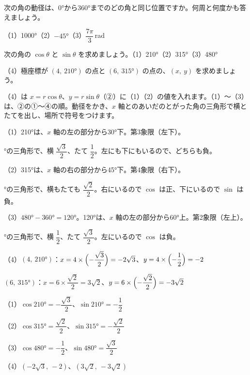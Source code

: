 \begin{jibun}
次の角の動径は、0°から360°までのどの角と同じ位置ですか。何周と何度かも答えましょう。\par
（1）1000°\quad（2）$-45°$\quad（3）$\dfrac{7\pi}{3}$\,rad
\end{jibun}

\begin{reidai}
次の角の $\cos\theta$ と $\sin\theta$ を求めましょう。\quad（1）210°\quad（2）315°\quad（3）480°\par
（4）極座標が $(4,\ 210°)$ の点と $(6,\ 315°)$ の点の、$(x,\ y)$ を求めましょう。\par
\kangaekata （4）は $x=r\cos\theta$、$y=r\sin\theta$（②）に（1）（2）の値を入れます。（1）〜（3）は、②の①〜④の順。動径をかき、$x$ 軸とのあいだのとがった角の三角形で横とたてを出し、場所で符号をつけます。\par
\shiki{}\zw{} （1）210°は、$x$ 軸の左の部分から30°下。第3象限（左下）。\par
{}°の三角形で、横 $\dfrac{\sqrt3}{2}$、たて $\dfrac{1}{2}$。左にも下にもいるので、どちらも負。\par
\bkiviq （2）315°は、$x$ 軸の右の部分から45°下。第4象限（右下）。\par
{}°の三角形で、横もたても $\dfrac{\sqrt2}{2}$。右にいるので $\cos$ は正、下にいるので $\sin$ は負。\par
\bkiviq （3）$480°-360°=120°$。120°は、$x$ 軸の左の部分から60°上。第2象限（左上）。\par
{}°の三角形で、横 $\dfrac{1}{2}$、たて $\dfrac{\sqrt3}{2}$。左にいるので $\cos$ は負。\par
\bkiviq （4）$(4,\ 210°)$：$x=4\times\Bigl(-\dfrac{\sqrt3}{2}\Bigr)=-2\sqrt3$、\enspace $y=4\times\Bigl(-\dfrac{1}{2}\Bigr)=-2$\par
\bkivib $(6,\ 315°)$：$x=6\times\dfrac{\sqrt2}{2}=3\sqrt2$、\enspace $y=6\times\Bigl(-\dfrac{\sqrt2}{2}\Bigr)=-3\sqrt2$\par
\kotae{}\zw{} （1）$\cos210°=-\dfrac{\sqrt3}{2}$、$\sin210°=-\dfrac{1}{2}$\par
\bkiviq （2）$\cos315°=\dfrac{\sqrt2}{2}$、$\sin315°=-\dfrac{\sqrt2}{2}$\par
\bkiviq （3）$\cos480°=-\dfrac{1}{2}$、$\sin480°=\dfrac{\sqrt3}{2}$\par
\bkiviq （4）$(-2\sqrt3,\ -2)$、$(3\sqrt2,\ -3\sqrt2)$
\end{reidai}

